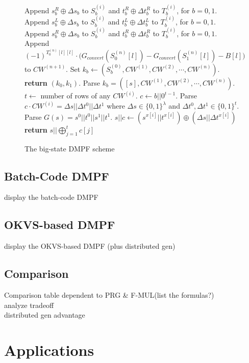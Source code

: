 \documentclass[sigconf]{acmart}
\begin{document}
\begin{figure}
{{\begin{algorithmic}[1]
  \State Append $s_b^R\oplus \Delta s_b$ to $S_b^{(i)}$ and $t_b^R\oplus \Delta t_b^R$ to $T_b^{(i)}$, for $b = 0,1$.
  \Else
  \State Append $s_b^L\oplus \Delta s_b$ to $S_b^{(i)}$ and $t_b^L\oplus \Delta t_b^L$ to $T_b^{(i)}$, for $b = 0,1$.
  \State Append $s_b^R\oplus \Delta s_b$ to $S_b^{(i)}$ and $t_b^R\oplus \Delta t_b^R$ to $T_b^{(i)}$, for $b = 0,1$.
  \EndIf
  \EndFor
  \EndFor
  \State Append $(-1)^{T_0^{(n)}[l][l]}\cdot\big(G_{convert}(S_0^{(n)}[l])-G_{convert}(S_1^{(n)}[l])-B[l]\big)$ to $CW^{(n+1)}$. 
  \EndFor
  \State Set $k_b \gets (S_b^{(0)}, CW^{(1)},CW^{(2)},\cdots,CW^{(n)})$.
  \State \textbf{return} $(k_0,k_1)$.
  \EndProcedure
  \State Parse $k_b = ([s],CW^{(1)},CW^{(2)},\cdots,CW^{(n)})$. 
  \State $t\leftarrow$ number of rows of any $CW^{(i)}$.
  \State $c\gets b||0^{t-1}$.
  \State Parse $c\cdot CW^{(i)} = \Delta s||\Delta t^0||\Delta t^1$ where $\Delta s\in\{0,1\}^\lambda$ and $\Delta t^0,\Delta t^1\in \{0,1\}^t$. 
  \State Parse $G(s) = s^0||t^0||s^1||t^1$. 
  \State $s||c\gets (s^{x[i]}||t^{x[i]})\oplus (\Delta s||\Delta t^{x[i]})$
  \EndFor
  \State \textbf{return} $s||\bigoplus_{j = 1}^t c[j]$
  \EndProcedure
  \end{algorithmic}
  }}
  \caption{The big-state DMPF scheme}
\end{figure}
\fi

\subsection{Batch-Code DMPF}
display the batch-code DMPF 

\subsection{OKVS-based DMPF}
display the OKVS-based DMPF (plus distributed gen)

\subsection{Comparison}
Comparison table dependent to PRG \& F-MUL(list the formulas?)\\
analyze tradeoff\\
distributed gen advantage

\section{Applications}
\end{document}

